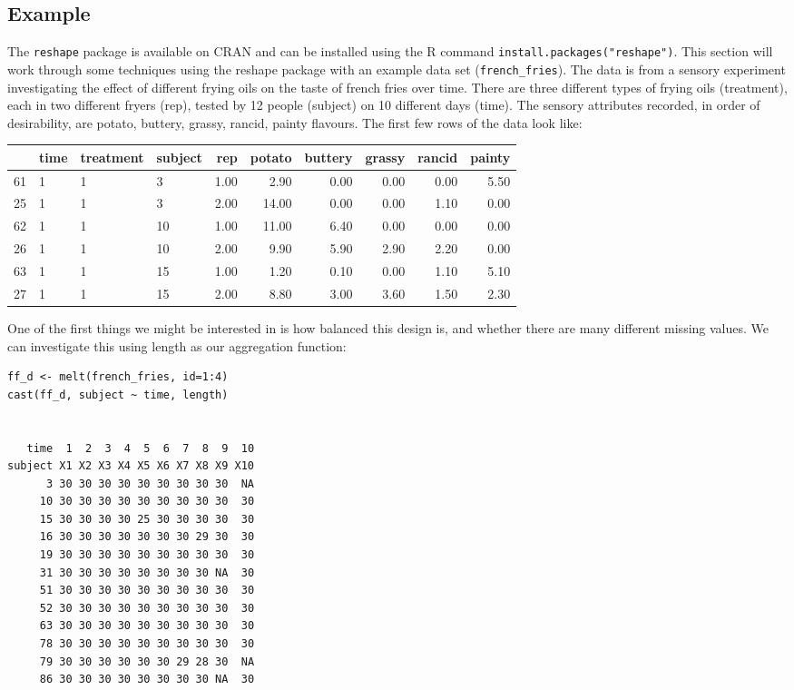 \documentclass[]{article}
\begin{document}
\subsection{Example}


The \texttt{reshape} package is available on CRAN and can be installed using the R command \texttt{install.packages("reshape")}.  This section will work through some techniques using the reshape package with an example data set (\texttt{french\_fries}).  The data is from a sensory experiment investigating the effect of different frying oils on the taste of french fries over time.  There are three different types of frying oils (treatment), each in two different fryers (rep), tested by 12 people (subject) on 10 different days (time).  The sensory attributes recorded, in order of desirability, are potato, buttery, grassy, rancid, painty flavours.  The first few rows of the data look like:

\begin{table}[ht]
\begin{center}
\begin{tabular}{rlllrrrrrr}
\hline
 & time & treatment & subject & rep & potato & buttery & grassy & rancid & painty \\
\hline
61 & 1 & 1 & 3 & 1.00 & 2.90 & 0.00 & 0.00 & 0.00 & 5.50 \\
25 & 1 & 1 & 3 & 2.00 & 14.00 & 0.00 & 0.00 & 1.10 & 0.00 \\
62 & 1 & 1 & 10 & 1.00 & 11.00 & 6.40 & 0.00 & 0.00 & 0.00 \\
26 & 1 & 1 & 10 & 2.00 & 9.90 & 5.90 & 2.90 & 2.20 & 0.00 \\
63 & 1 & 1 & 15 & 1.00 & 1.20 & 0.10 & 0.00 & 1.10 & 5.10 \\
27 & 1 & 1 & 15 & 2.00 & 8.80 & 3.00 & 3.60 & 1.50 & 2.30 \\
\hline
\end{tabular}
\end{center}
\end{table}


One of the first things we might be interested in is how balanced this design is, and whether there are many different missing values.  We can investigate this using length as our aggregation function:

\begin{verbatim}
ff_d <- melt(french_fries, id=1:4)
cast(ff_d, subject ~ time, length)

                                      
   time  1  2  3  4  5  6  7  8  9  10
subject X1 X2 X3 X4 X5 X6 X7 X8 X9 X10
      3 30 30 30 30 30 30 30 30 30  NA
     10 30 30 30 30 30 30 30 30 30  30
     15 30 30 30 30 25 30 30 30 30  30
     16 30 30 30 30 30 30 30 29 30  30
     19 30 30 30 30 30 30 30 30 30  30
     31 30 30 30 30 30 30 30 30 NA  30
     51 30 30 30 30 30 30 30 30 30  30
     52 30 30 30 30 30 30 30 30 30  30
     63 30 30 30 30 30 30 30 30 30  30
     78 30 30 30 30 30 30 30 30 30  30
     79 30 30 30 30 30 30 29 28 30  NA
     86 30 30 30 30 30 30 30 30 NA  30
\end{verbatim}
\end{document}
